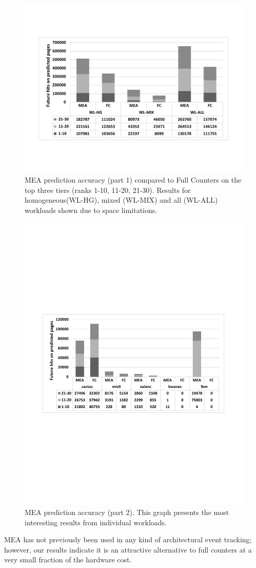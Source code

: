 \begin{figure}[t]
\centering
  \includegraphics[scale=.3]{figures/mea_2_v2.pdf}
  \caption{MEA prediction accuracy (part 1) compared to Full Counters on the top three tiers (ranks 1-10, 11-20, 21-30). Results for homogeneous(WL-HG), mixed (WL-MIX) and all (WL-ALL) workloads shown due to space limitations.}
  \label{fig:mea_2}
\end{figure}

\begin{figure}[t]
\centering
  \includegraphics[scale=.45]{figures/mea_3_v2.pdf}
  \caption{MEA prediction accuracy (part 2). This graph presents the most interesting results from individual workloads.}
  \label{fig:mea_3}
\end{figure}

MEA has not previously been used in any kind of architectural event
tracking; however, our results indicate it is an attractive
alternative to full counters at a very small fraction of the hardware cost.
